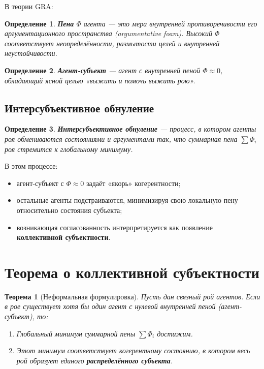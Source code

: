 \documentclass[11pt,a4paper]{article}
\newtheorem{theorem}{Теорема}
\newtheorem{definition}{Определение}
\begin{document}
В теории GRA:

\begin{definition}
\textbf{Пена} $\Phi$ агента — это мера внутренней противоречивости его аргументационного пространства (argumentative foam).
Высокий $\Phi$ соответствует неопределённости, размытости целей и внутренней неустойчивости.
\end{definition}

\begin{definition}
\textbf{Агент-субъект} — агент с внутренней пеной $\Phi \approx 0$, обладающий ясной целью «выжить и помочь выжить рою».
\end{definition}

\subsection{Интерсубъективное обнуление}

\begin{definition}
\textbf{Интерсубъективное обнуление} — процесс, в котором агенты роя обмениваются состояниями и аргументами так, что суммарная пена $\sum \Phi_i$ роя стремится к глобальному минимуму.
\end{definition}

В этом процессе:
\begin{itemize}
  \item агент-субъект с $\Phi \approx 0$ задаёт «якорь» когерентности;
  \item остальные агенты подстраиваются, минимизируя свою локальную пену относительно состояния субъекта;
  \item возникающая согласованность интерпретируется как появление \textbf{коллективной субъектности}.
\end{itemize}

\section{Теорема о коллективной субъектности}

\begin{theorem}[Неформальная формулировка]
Пусть дан связный рой агентов.
Если в рое существует хотя бы один агент с нулевой внутренней пеной (агент-субъект), то:
\begin{enumerate}
  \item Глобальный минимум суммарной пены $\sum \Phi_i$ достижим.
  \item Этот минимум соответствует когерентному состоянию, в котором весь рой образует единого \textbf{распределённого субъекта}.
\end{enumerate}
\end{theorem}
\end{document}
